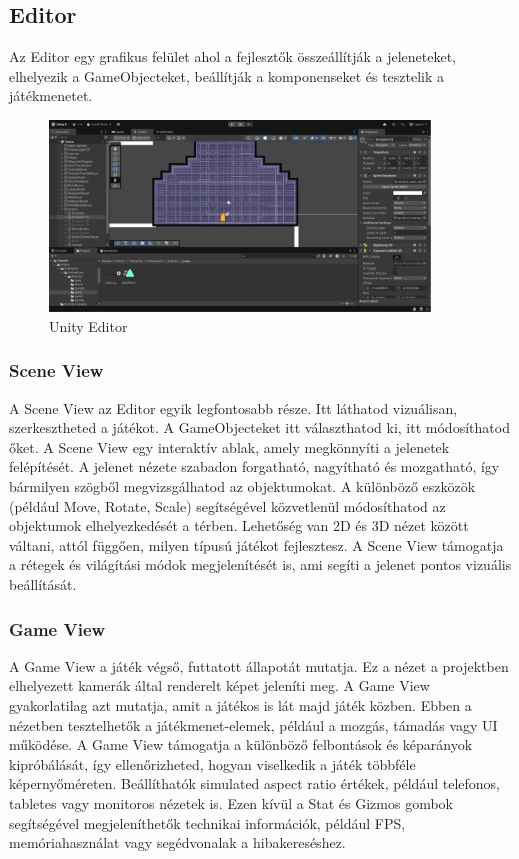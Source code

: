\documentclass[
]{thesis-ekf}
\theoremstyle{definition}
\theoremstyle{remark}
\begin{document}
\subsection{Editor}
Az Editor egy grafikus felület ahol a fejlesztők összeállítják a jeleneteket, elhelyezik a GameObjecteket, beállítják a komponenseket és tesztelik a játékmenetet.

\begin{figure}[h!]
	\centering
	\includegraphics[width=0.9\textwidth]{UnityEditorKep.png}
	\caption{Unity Editor}
	\label{fig:unityEditor}
\end{figure}

\subsubsection{Scene View}
A Scene View az Editor egyik legfontosabb része. Itt láthatod vizuálisan, szerkesztheted a játékot. A GameObjecteket itt választhatod ki, itt módosíthatod őket. A Scene View egy interaktív ablak, amely megkönnyíti a jelenetek felépítését.
A jelenet nézete szabadon forgatható, nagyítható és mozgatható, így bármilyen szögből megvizsgálhatod az objektumokat. A különböző eszközök (például Move, Rotate, Scale) segítségével közvetlenül módosíthatod az objektumok elhelyezkedését a térben. Lehetőség van 2D és 3D nézet között váltani, attól függően, milyen típusú játékot fejlesztesz. A Scene View támogatja a rétegek és világítási módok megjelenítését is, ami segíti a jelenet pontos vizuális beállítását.\cite{UnityScene}
\subsubsection{Game View}
A Game View a játék végső, futtatott állapotát mutatja. Ez a nézet a projektben elhelyezett kamerák által renderelt képet jeleníti meg. A Game View gyakorlatilag azt mutatja, amit a játékos is lát majd játék közben.
Ebben a nézetben tesztelhetők a játékmenet-elemek, például a mozgás, támadás vagy UI működése. A Game View támogatja a különböző felbontások és képarányok kipróbálását, így ellenőrizheted, hogyan viselkedik a játék többféle képernyőméreten. Beállíthatók simulated aspect ratio értékek, például telefonos, tabletes vagy monitoros nézetek is. Ezen kívül a Stat és Gizmos gombok segítségével megjeleníthetők technikai információk, például FPS, memóriahasználat vagy segédvonalak a hibakereséshez.\cite{UnityGameView}
\end{document}
